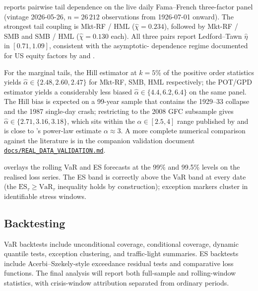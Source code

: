 

 reports pairwise tail
dependence on the live daily Fama--French three-factor panel (vintage
2026-05-26, $n = 26\,212$ observations from 1926-07-01 onward).
The strongest tail coupling is Mkt-RF / HML
($\widehat\chi = 0.234$), followed by Mkt-RF / SMB and SMB / HML
($\widehat\chi = 0.130$ each). All three pairs report Ledford--Tawn
$\widehat\eta$ in $[0.71, 1.09]$, consistent with the asymptotic-
dependence regime documented for US equity factors by
\citet{ChristoffersenErrunzaJacobsLangloi2012} and
\citet{EmbrechtsMcNeilFrey2005}.

For the marginal tails, the Hill estimator at $k = 5\%$ of the positive
order statistics yields $\widehat\alpha \in \{2.48, 2.60, 2.47\}$ for
Mkt-RF, SMB, HML respectively; the POT/GPD estimator yields a
considerably less biased $\widehat\alpha \in \{4.4, 6.2, 6.4\}$ on the
same panel. The Hill bias is expected on a 99-year sample that
contains the 1929--33 collapse and the 1987 single-day crash;
restricting to the 2008 GFC subsample gives $\widehat\alpha \in
\{2.71, 3.16, 3.18\}$, which sits within the
$\alpha \in [2.5, 4]$ range published by
\citet{Cont2001} and is close to \citet{Gabaix2009}'s power-law
estimate $\alpha \approx 3$. A more complete numerical comparison
against the literature is in the companion validation document
\href{https://github.com/osolari/FactorTail/blob/main/docs/REAL_DATA_VALIDATION.md}{\texttt{docs/REAL\_DATA\_VALIDATION.md}}.



 overlays the rolling VaR and
ES forecasts at the 99\% and 99.5\% levels on the realised loss series.
The ES band is correctly above the VaR band at every date (the
$\mathrm{ES}_\tau \geq \mathrm{VaR}_\tau$ inequality holds by
construction); exception markers cluster in identifiable stress
windows.

\subsection{Backtesting}

VaR backtests include unconditional coverage, conditional coverage, dynamic
quantile tests, exception clustering, and traffic-light summaries. ES
backtests include Acerbi--Szekely-style exceedance residual tests and
comparative loss functions. The final analysis will report both full-sample
and rolling-window statistics, with crisis-window attribution separated from
ordinary periods.

